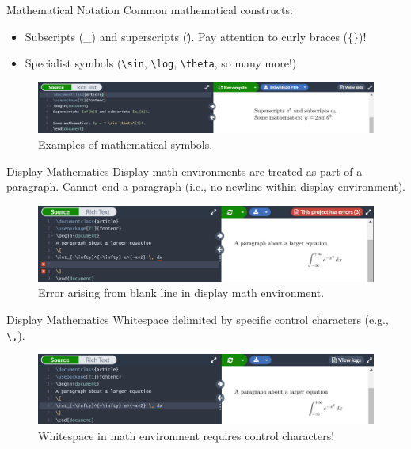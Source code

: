 \documentclass{beamer}
\begin{document}
{  \begin{frame}{Mathematical Notation}
    Common mathematical constructs:
    \begin{itemize}
      \item Subscripts (\_) and superscripts (\^). Pay attention to curly braces ($\{\}$)!
      \item Specialist symbols (\texttt{\textbackslash sin}, \texttt{\textbackslash log}, \texttt{\textbackslash theta}, so many more!)
    \end{itemize}
    \begin{figure}
      \includegraphics[width=1.0\linewidth]{day02-01B-symbols.png}
      \caption{Examples of mathematical symbols.}
      \label{fig:day02-01B}
    \end{figure}
  \end{frame}

  \begin{frame}{Display Mathematics}
    Display math environments are treated as part of a paragraph. Cannot end a paragraph (i.e., no newline within display environment).
    \begin{figure}
      \includegraphics[width=1.0\linewidth]{day02-01C-error.png}
      \caption{Error arising from blank line in display math environment.}
      \label{fig:day02-01C}
    \end{figure}
  \end{frame}

  \begin{frame}{Display Mathematics}
    Whitespace delimited by specific control characters (e.g., \texttt{\textbackslash ,}).
    \begin{figure}
      \includegraphics[width=1.0\linewidth]{day02-01D-whitespace.png}
      \caption{Whitespace in math environment requires control characters!}
      \label{fig:day02-01D}
    \end{figure}
  \end{frame}

}
\end{document}

